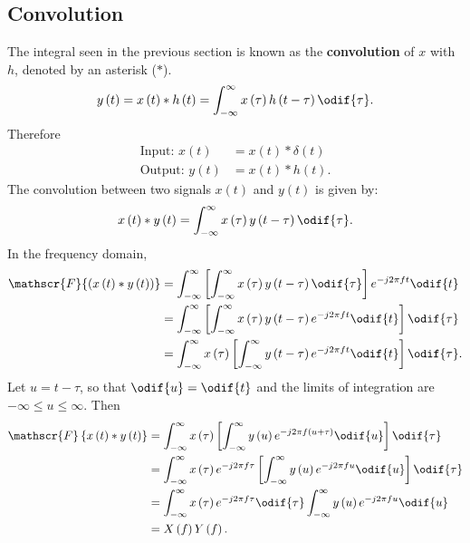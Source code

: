 \documentclass{article}
\begin{document}
\subsection{Convolution}
The integral seen in the previous section is known as the \textbf{convolution} of \(x\) with \(h\), denoted
by an asterisk (\(\ast\)).
\begin{equation*}
    y\left( t \right) = x\left( t \right) * h\left( t \right) = \int_{-\infty}^\infty x\left( \tau \right) h\left( t - \tau \right) \odif{\tau}.
\end{equation*}
Therefore
\begin{align*}
    \text{Input: } x\left( t \right)  & = x\left( t \right) * \delta\left( t \right) \\
    \text{Output: } y\left( t \right) & = x\left( t \right) * h\left( t \right).
\end{align*}
The convolution between two signals \(x\left( t \right)\) and \(y\left( t \right)\) is given by:
\begin{equation*}
    x\left( t \right) \ast y\left( t \right) = \int_{-\infty}^\infty x\left( \tau \right) y\left( t - \tau \right) \odif{\tau}.
\end{equation*}
In the frequency domain,
\begin{align*}
    \mathscr{F}{\left( x\left( t \right) \ast y\left( t \right) \right)} & = \int_{-\infty}^\infty \left[ \int_{-\infty}^\infty x\left( \tau \right) y\left( t - \tau \right) \odif{\tau} \right] e^{-j 2 \pi f t} \odif{t}  \\
                                                                         & = \int_{-\infty}^\infty \left[ \int_{-\infty}^\infty x\left( \tau \right) y\left( t - \tau \right) e^{-j 2 \pi f t} \odif{t} \right] \odif{\tau}  \\
                                                                         & = \int_{-\infty}^\infty x\left( \tau \right) \left[ \int_{-\infty}^\infty y\left( t - \tau \right) e^{-j 2 \pi f t} \odif{t} \right] \odif{\tau}.
\end{align*}
Let \(u = t - \tau\), so that \(\odif{u} = \odif{t}\) and the limits of integration are \(-\infty \leq u \leq \infty\).
Then
\begin{align*}
    \mathscr{F}\left\{ x\left( t \right) \ast y\left( t \right) \right\} & = \int_{-\infty}^\infty x\left( \tau \right) \left[ \int_{-\infty}^\infty y\left( u \right) e^{-j 2 \pi f \left( u + \tau \right)} \odif{u} \right] \odif{\tau} \\
                                                                         & = \int_{-\infty}^\infty x\left( \tau \right) e^{-j 2 \pi f \tau} \left[ \int_{-\infty}^\infty y\left( u \right) e^{-j 2 \pi f u} \odif{u} \right] \odif{\tau}   \\
                                                                         & = \int_{-\infty}^\infty x\left( \tau \right) e^{-j 2 \pi f \tau} \odif{\tau} \int_{-\infty}^\infty y\left( u \right) e^{-j 2 \pi f u} \odif{u}                  \\
                                                                         & = X\left( f \right) Y\left( f \right).
\end{align*}
\end{document}
